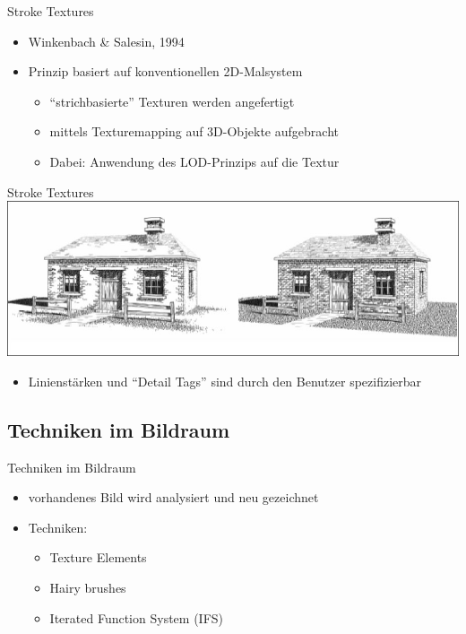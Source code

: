 \begin{frame}{Stroke Textures}
  \begin{itemize}
    \item Winkenbach \& Salesin, 1994
    \item Prinzip basiert auf konventionellen 2D-Malsystem
    \begin{itemize}
      \item "`strichbasierte"' Texturen werden angefertigt
      \item mittels Texturemapping auf 3D-Objekte aufgebracht
      \item Dabei: Anwendung des LOD-Prinzips auf die Textur
    \end{itemize}
  \end{itemize}
\end{frame}

\begin{frame}{Stroke Textures}
  \includegraphics[width=\textwidth]{../images/strokes.jpg}
  \begin{itemize}
    \item Linienstärken und "`Detail Tags"' sind durch den
    Benutzer spezifizierbar
  \end{itemize}
\end{frame}

\subsection{Techniken im Bildraum}
\begin{frame}{Techniken im Bildraum}
  \begin{itemize}
    \item vorhandenes Bild wird analysiert und neu
    gezeichnet
    \item Techniken:
    \begin{itemize}
      \item Texture Elements
      \item Hairy brushes
      \item Iterated Function System (IFS)
    \end{itemize}
  \end{itemize}
\end{frame}

